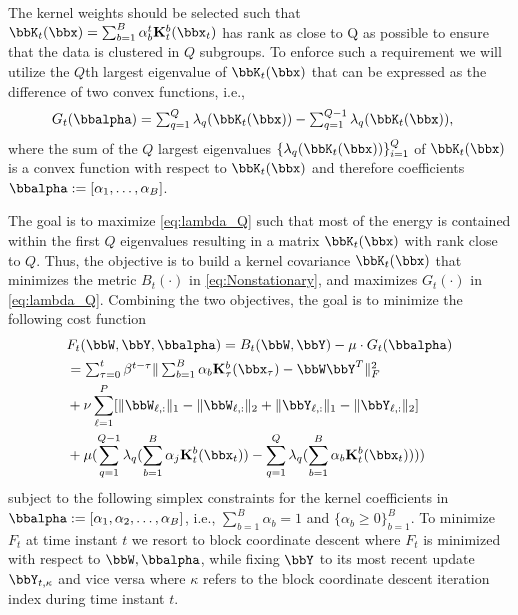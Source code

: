 \documentclass[10pt,final]{IEEEtran}
\begin{document}
The kernel weights should be selected such that $\bbK_{t}(\bbx)=\sum_{b=1}^{B} {\alpha}_b^t \mathbf{K}_{t}^b(\bbx_{t})$ has rank as close to Q as possible to ensure that the data is clustered in $Q$ subgroups.
To enforce such a requirement we will utilize the $Q$th largest eigenvalue of $\bbK_{t}(\bbx)$ that can  be expressed as the difference of two convex functions, i.e.,
\begin{align}\label{eq:lambda_Q}
G_t(\bbalpha)&=\textstyle\sum_{q=1}^{Q}\lambda_{q}(\bbK_{t}(\bbx))-\textstyle\sum_{q=1}^{Q-1}\lambda_{q}(\bbK_{t}(\bbx)),
\end{align}
where the sum of the $Q$ largest eigenvalues $\{\lambda_{q}(\bbK_{t}(\bbx))\}_{i=1}^Q$ of $\bbK_{t}(\bbx)$ is a convex function with respect to $\bbK_{t}(\bbx)$ and therefore coefficients $\bbalpha:=[\alpha_1,\ldots,\alpha_B] $\cite{Convex}.

The goal is to maximize \eqref{eq:lambda_Q} such that most of the energy is contained within the first $Q$ eigenvalues resulting in a matrix $\bbK_{t}(\bbx)$ with rank close to $Q$. Thus, the objective is to build a kernel covariance $\bbK_{t}(\bbx)$ that minimizes the metric $B_t(\cdot)$ in \eqref{eq:Nonstationary}, and maximizes $G_t(\cdot)$ in \eqref{eq:lambda_Q}. Combining the two objectives, the goal is to minimize the following cost function
\begin{align}\label{eq:Eq1}
&F_t(\bbW,\bbY,\bbalpha)=B_t(\bbW,\bbY)-\mu\cdot G_t(\bbalpha)\\
&=\textstyle\sum_{\tau=0}^{t}\beta^{t-\tau}\|\sum_{b=1}^{B} {\alpha}_b \mathbf{K}_{\tau}^b(\bbx_{\tau})-\bbW\bbY^T\|_F^2\nonumber\\
\hspace{-2cm}&+\nu\sum_{\ell=1}^{P}[\|\bbW_{\ell,:}\|_1-\|\bbW_{\ell,:}\|_2
+\|\bbY_{\ell,:}\|_1-\|\bbY_{\ell,:}\|_2]\nonumber\\
&+\mu(\sum_{q=1}^{Q-1}\lambda_{q}(\sum_{b=1}^{B}\alpha_j \mathbf{K}_{t}^b(\bbx_{t}))-\sum_{q=1}^{Q}\lambda_{q}(\sum_{b=1}^{B}\alpha_b\mathbf{K}_{t}^b(\bbx_{t}))))\nonumber
\end{align}
subject to the following simplex constraints for the kernel coefficients in $\bbalpha:=[\alpha_1,\alpha_2,\ldots,\alpha_B]$, i.e., 
$\sum_{b=1}^{B}\alpha_b=1$ and $\{\alpha_b\geq 0\}_{b= 1}^B$. To minimize $F_t$ at time instant $t$ we resort to block coordinate descent where $F_t$ is minimized with respect to $\bbW,\bbalpha$, while fixing $\bbY$ to its most recent update $\bbY_{t,\kappa}$ and vice versa where $\kappa$ refers to the block coordinate descent iteration index during time instant $t$.
\end{document}
